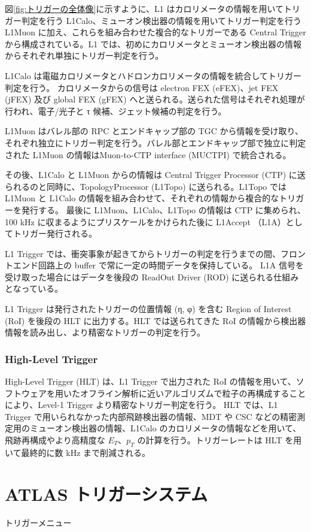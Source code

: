 図\ref{fig:トリガーの全体像}に示すように、L1 はカロリメータの情報を用いてトリガー判定を行う L1Calo、ミューオン検出器の情報を用いてトリガー判定を行う L1Muon に加え、これらを組み合わせた複合的なトリガーである Central Trigger から構成されている。L1 では、初めにカロリメータとミューオン検出器の情報からそれぞれ単独にトリガー判定を行う。

L1Calo は電磁カロリメータとハドロンカロリメータの情報を統合してトリガー判定を行う。
カロリメータからの信号は electron FEX (eFEX)、jet FEX (jFEX) 及び global FEX (gFEX) へと送られる。送られた信号はそれぞれ処理が行われ、電子/光子と τ 候補、ジェット候補の判定を行う。

L1Muon はバレル部の RPC とエンドキャップ部の TGC から情報を受け取り、それぞれ独立にトリガー判定を行う。バレル部とエンドキャップ部で独立に判定された L1Muon の情報はMuon-to-CTP interface (MUCTPI) で統合される。

その後、L1Calo と L1Muon からの情報は Central Trigger Processor (CTP) に送られるのと同時に、TopologyProcessor (L1Topo) に送られる。L1Topo では L1Muon と L1Calo の情報を組み合わせて、それぞれの情報から複合的なトリガーを発行する。
最後に L1Muon、L1Calo、L1Topo の情報は CTP に集められ、100 kHz に収まるようにプリスケールをかけられた後に L1Accept （L1A）としてトリガー発行される。

L1 Trigger では、衝突事象が起きてからトリガーの判定を行うまでの間、フロントエンド回路上の buffer で常に一定の時間データを保持している。
L1A 信号を受け取った場合にはデータを後段の ReadOut Driver (ROD) に送られる仕組みとなっている。

L1 Trigger は発行されたトリガーの位置情報 (η, φ) を含む Region of Interest (RoI) を後段の HLT に出力する。HLT では送られてきた RoI の情報から検出器情報を読み出し、より精密なトリガーの判定を行う。

\subsubsection{High-Level Trigger}
High-Level Trigger (HLT) は、L1 Trigger で出力された RoI の情報を用いて、ソフトウェアを用いたオフライン解析に近いアルゴリズムで粒子の再構成することにより、Level-1 Trigger より精密なトリガー判定を行う。
HLT では、L1 Trigger で用いられなかった内部飛跡検出器の情報、MDT や CSC などの精密測定用のミューオン検出器の情報、L1Calo のカロリメータの情報などを用いて、飛跡再構成やより高精度な $E_T$、$p_T$ の計算を行う。トリガーレートは HLT を用いて最終的に数 kHz まで削減される。

\section{ATLAS トリガーシステム}
トリガーメニュー






